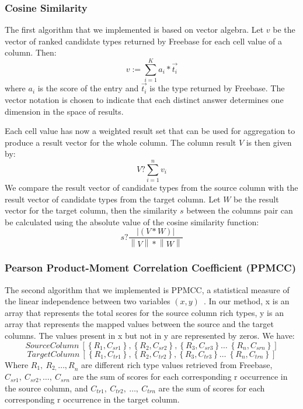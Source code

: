 \documentclass{sig-alternate}
\begin{document}
\subsubsection{Cosine Similarity}
The first algorithm that we implemented is based on vector algebra. Let $v$ be the vector of ranked candidate types returned by Freebase for each cell value of a column. Then:
\[v:=\sum^K_{i=1}{a_i}*\overrightarrow{t_i}\]
where $a_i$ is the score of the entry and $\overrightarrow{t_i}$ is the type returned by Freebase. The vector notation is chosen to indicate that each distinct answer determines one dimension in the space of results.

Each cell value has now a weighted result set that can be used for aggregation to produce a result vector for the whole column. The column result $V$ is then given by:
\[V?\sum^n_{i=1}{v_i}\]
We compare the result vector of candidate types from the source column with the result vector of candidate types from the target column. Let $W$ be the result vector for the target column, then the similarity $s$ between the columns pair can be calculated using the absolute value of the cosine similarity function:
\[s?\frac{\left|(V*W)\right|}{\left\|V\right\|*\left\|W\right\|}\]


\subsubsection{Pearson Product-Moment Correlation Coefficient (PPMCC)}

The second algorithm that we implemented is PPMCC, a statistical measure of the linear independence between two variables $\left(x,y\right)$~\cite{citeulike:8051946}. In our method, x is an array that represents the total scores for the source column rich types, y is an array that represents the mapped values between the source and the target columns. The values present in x but not in y are represented by zeros. We have:
\[SourceColumn\ \left[\left\{R_1,C_{sr1}\right\},\left\{R_2,C_{sr2}\right\},\left\{R_3,C_{sr3}\right\}\dots \ \left\{R_n,C_{srn}\right\}\right]\]
\[TargetColumn\ \left[\left\{R_1,C_{tr1}\right\},\left\{R_2,C_{tr2}\right\},\left\{R_3,C_{tr3}\right\}\dots \ \left\{R_n,C_{trn}\right\}\right]\]
Where $R_1,\ R_{2,}{\dots ,R}_n$ are different rich type values retrieved from Freebase, $C_{sr1},\ C_{sr2},\dots ,\ C_{srn}$ are the sum of scores for each corresponding r occurrence in the source column, and $C_{tr1},\ C_{tr2},\ \dots ,\ C_{trn}$ are the sum of scores for each corresponding r occurrence in the target column.
\end{document}
